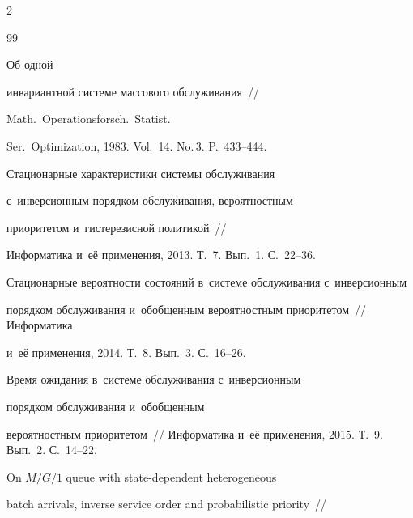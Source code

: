 \begin{multicols}{2}
{{\begin{thebibliography}{99}


 Об одной


инвариантной системе массового обслуживания~//


Math.\ Operationsforsch.\ Statist.


Ser.\ Optimization, 1983. Vol.~14. No.\,3. P.~433--444.









Стационарные характеристики системы обслуживания 


с~инверсионным порядком обслуживания, вероятностным


приоритетом и~гистерезисной политикой~//


Информатика и~её применения, 2013. Т.~7. Вып.~1. С.~22--36.


















Стационарные вероятности состояний в~системе обслуживания с~инверсионным 


порядком обслуживания и~обобщенным вероятностным приоритетом~// Информатика 


и~её применения, 2014. Т.~8. Вып.~3. С.~16--26.









Время ожидания в~системе обслуживания с~инверсионным 


порядком обслуживания и~обобщенным


вероятностным приоритетом~// Информатика и~её применения, 2015. Т.~9. Вып.~2. С.~14--22.







 On ${M/G/1}$ queue with state-dependent heterogeneous 


batch arrivals, inverse service order and probabilistic priority~// 



\end{thebibliography}}}
\end{multicols}
